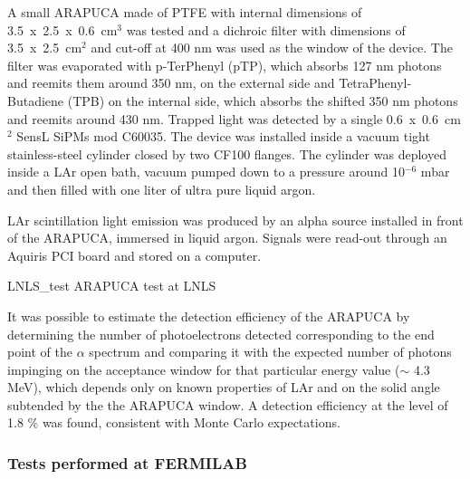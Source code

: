 A small ARAPUCA made of PTFE with internal dimensions of 3.5~x~2.5~x~0.6~cm$^3$ was tested and a dichroic filter with dimensions of 3.5~x~2.5~cm$^2$ and cut-off at 400 nm was used as the window of the device.
The filter was evaporated with p-TerPhenyl (pTP), which absorbs 127 nm photons and reemits them around 350 nm,  on the external side and TetraPhenyl-Butadiene (TPB) on the internal side, which absorbs the shifted 350 nm photons and reemits around 430 nm. Trapped light was detected by a single 0.6~x~0.6~cm$^2$  SensL SiPMs mod C60035.
The device was installed inside a vacuum tight stainless-steel cylinder closed by two CF100 flanges. The cylinder was deployed inside a LAr open bath, vacuum pumped down to a pressure around  10$^{-6}$ mbar and then filled with one liter of ultra pure liquid argon. 

LAr scintillation light emission was produced by an alpha source installed in front of the ARAPUCA, immersed in liquid argon. Signals were read-out through an Aquiris PCI board and stored on a computer.

\begin{dunefigure}{LNLS_test}
{ARAPUCA test at LNLS} 
\end{dunefigure}

It was possible to estimate the detection efficiency of the ARAPUCA by 
determining the number of photoelectrons detected corresponding to the end point of the $\alpha$ spectrum 
and comparing it with the expected number of photons impinging on the acceptance window for that 
particular energy value ($\sim$ 4.3 MeV), which depends only on known properties of LAr and on the solid 
angle subtended by the the ARAPUCA window. A detection efficiency at the level of 1.8 \% 
was found,  consistent with Monte Carlo expectations.

\subsubsection{Tests performed at FERMILAB}
\label{subsec:test_fnal}

